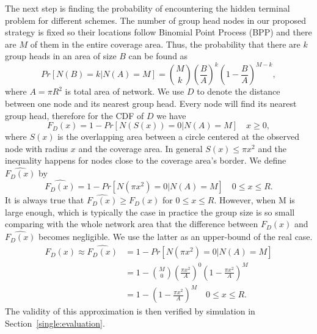 The next step is finding the probability of encountering the hidden terminal problem for different schemes. The number of group head nodes in our proposed strategy is fixed so their locations follow Binomial Point Process (BPP) and there are $M$ of them in the entire coverage area. Thus, the probability that there are $k$ group heads in an area of size $B$ can be found as
\begin{equation}
Pr[ N(B)=k | N(A)=M]={M \choose k} \left( \frac{B}{A} \right)^k \left( 1- \frac{B}{A} \right)^{M-k},
\end{equation}
where $A=\pi R^2$ is total area of network. We use $D$ to denote the distance between one node and its nearest group head. Every node will find its nearest group head, therefore for the CDF of $D$ we have
\begin{equation}
F_D(x)=1-Pr[N(S(x))=0 | N(A)=M] \quad x \geq 0,
\end{equation}
where $S(x)$ is the overlapping area between a circle centered at the observed node with radius $x$ and the coverage area. In general $S(x) \leq \pi x^2$ and the inequality happens for nodes close to the coverage area's border. We define $\hat{F_D(x)}$ by
\begin{equation}
\hat{F_D(x)}=1-Pr[N(\pi x^2)=0 | N(A)=M] \quad 0 \leq x \leq R.
\end{equation}
It is always true that $\hat{F_D(x)} \geq F_D(x)$ for $0 \leq x \leq R$. However, when M is large enough, which is typically the case in practice \cite{zheng2014performance} the group size is so small comparing with the whole network area that the difference between $F_D(x)$ and $\hat{F_D(x)}$ becomes negligible. We use the latter as an upper-bound of the real case.
\begin{equation} \label{eq:cdf}
\begin{split}
F_D(x) \approx \hat{F_D(x)} &=1-Pr[N(\pi x^2)=0 | N(A)=M] \\
&=1- {M \choose 0} \left( \frac{\pi x^2}{A} \right)^0 \left( 1- \frac{\pi x^2}{A} \right)^{M} \\
&=1- \left( 1- \frac{\pi x^2}{A} \right)^{M} \quad 0 \leq x \leq R.
\end{split}
\end{equation}
The validity of this approximation is then verified by simulation in Section~\ref{single:evaluation}.

